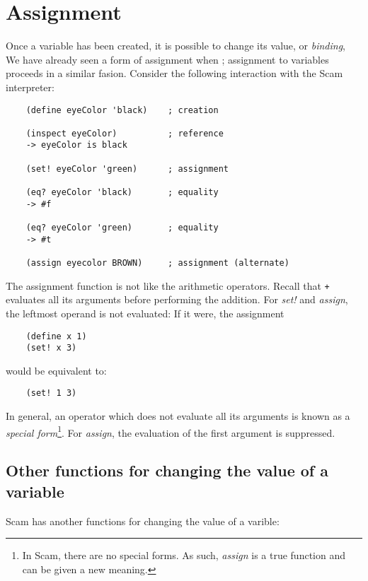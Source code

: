 \chapter{Assignment}
\label{Assignment}

Once a variable has been created, it is possible to change its value,
or {\it binding},
We have already seen a form of assignment when
;
assignment to variables proceeds in a similar fasion.
Consider the following interaction with
the Scam interpreter:

\begin{verbatim}
    (define eyeColor 'black)    ; creation
    
    (inspect eyeColor)          ; reference
    -> eyeColor is black
    
    (set! eyeColor 'green)      ; assignment
    
    (eq? eyeColor 'black)       ; equality
    -> #f
    
    (eq? eyeColor 'green)       ; equality
    -> #t

    (assign eyecolor BROWN)     ; assignment (alternate)
\end{verbatim}

The assignment function is not like the arithmetic operators.
Recall that {\tt +} evaluates all its arguments
before performing the addition.
For {\it set!} and {\it assign},
the leftmost operand is not evaluated:
If it were, the assignment

\begin{verbatim}
    (define x 1)
    (set! x 3)
\end{verbatim}
    
would be equivalent to:

\begin{verbatim}
    (set! 1 3)
\end{verbatim}

In general, an operator which does not evaluate
all its arguments is known as a {\it special form}\footnote{
In Scam, there are no special forms. As such, {\it assign} is
a true function and can be given a new meaning.}.
For {\it assign}, the evaluation of the first argument
is suppressed.

\section{Other functions for changing the value of a variable}

Scam has another functions for changing the value of a
varible:

